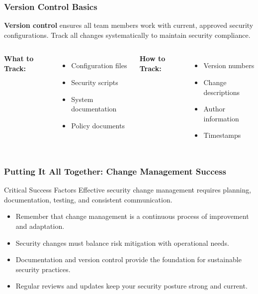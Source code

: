 \documentclass{beamer}
\begin{document}
                    \begin{frame}
                    \frametitle{Version Control Basics}
                    \textbf{Version control} ensures all team members work with current, approved security configurations. Track all changes systematically to maintain security compliance.
                    \begin{columns}[t]
                    \textbf{What to Track:}
                    \begin{itemize}
                        \item Configuration files
                        \item Security scripts
                        \item System documentation
                        \item Policy documents
                    \end{itemize}
                    \textbf{How to Track:}
                    \begin{itemize}
                        \item Version numbers
                        \item Change descriptions
                        \item Author information
                        \item Timestamps
                    \end{itemize}
                    \end{columns}
                    
                    \end{frame}
                    
                    \begin{frame}
                    \frametitle{Putting It All Together: Change Management Success}
                    \begin{alertblock}{Critical Success Factors}
                    Effective security change management requires planning, documentation, testing, and consistent communication.
                    \end{alertblock}
                    \begin{itemize}
                        \item Remember that change management is a continuous process of improvement and adaptation.
                        
                        \item Security changes must balance risk mitigation with operational needs.
                        
                        \item Documentation and version control provide the foundation for sustainable security practices.
                        
                        \item Regular reviews and updates keep your security posture strong and current.
                    \end{itemize}
                    \end{frame}
\end{document}
